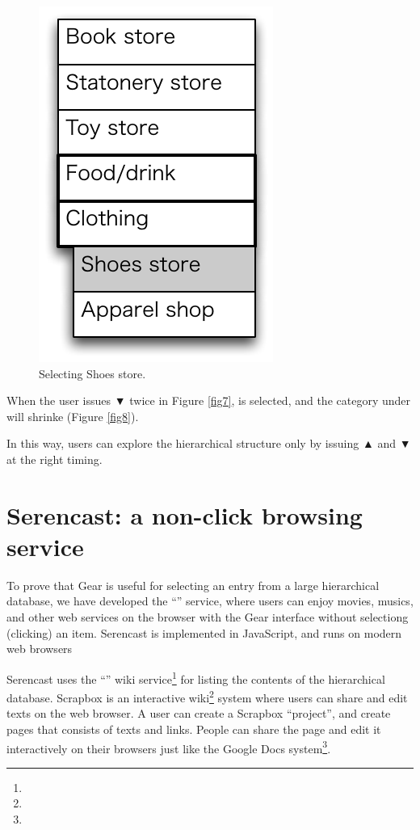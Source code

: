 \documentclass[conference]{IEEEtran}
\def\up{▲}
\def\down{▼}
\def\SC{Serencast}
\def\SB{Scrapbox}
\begin{document}
\begin{figure}[H]
\centerline{\includegraphics[width=\menuwidth,bb=0 0 139 211]{figures/fig9.pdf}}
\caption{Selecting Shoes store.}
\label{fig9}
\end{figure}

When the user issues {\down} twice in Figure \ref{fig7},
 is selected, and the category under  will shrinke (Figure \ref{fig8}).

In this way, users can explore the hierarchical structure
only by issuing {\up} and {\down} at the right timing.

\section{Serencast: a non-click browsing service}


To prove that Gear is useful for selecting an entry from a
large hierarchical database,
we have developed the ``\tsf{\SC}'' service, where
users can enjoy movies, musics, and other web services
on the browser with the Gear interface without selectiong (clicking) an item.
{\SC} is implemented in JavaScript, and runs on modern web browsers

{\SC} uses the ``\tsf{\SB}'' wiki service\footnote{
} for listing the contents of the hierarchical database.
{\SB} is an interactive wiki\footnote{
} system where users can share and edit texts on the web browser.
A user can create a {\SB} ``project'', and create pages
that consists of texts and links.
People can share the page and edit it interactively on their browsers
just like the Google Docs system\footnote{
}.
\end{document}
